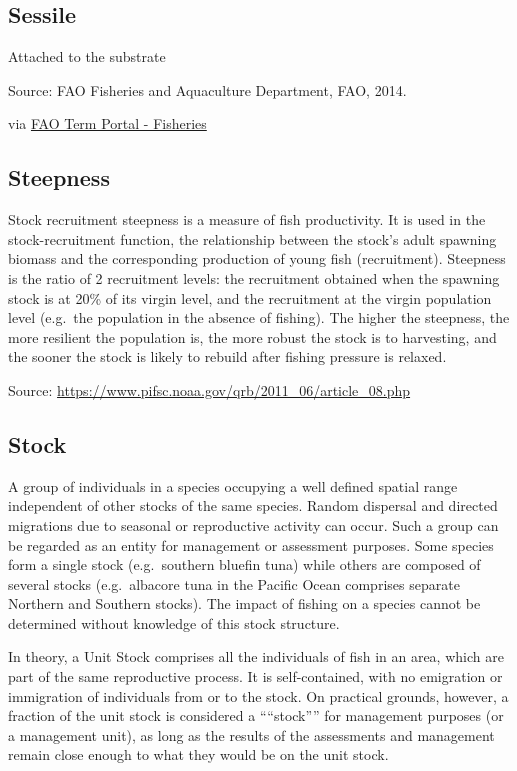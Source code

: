 \documentclass[
  11pt,
]{book}
\begin{document}
\hypertarget{sessile}{%
\subsection{Sessile}\label{sessile}}

Attached to the substrate

Source: FAO Fisheries and Aquaculture Department, FAO, 2014.

via \href{http://www.fao.org/fishery/glossary/en}{FAO Term Portal - Fisheries}

\hypertarget{steepness}{%
\subsection{Steepness}\label{steepness}}

Stock recruitment steepness is a measure of fish productivity. It is used in the stock-recruitment function, the relationship between the stock's adult spawning biomass and the corresponding production of young fish (recruitment). Steepness is the ratio of 2 recruitment levels: the recruitment obtained when the spawning stock is at 20\% of its virgin level, and the recruitment at the virgin population level (e.g.~the population in the absence of fishing). The higher the steepness, the more resilient the population is, the more robust the stock is to harvesting, and the sooner the stock is likely to rebuild after fishing pressure is relaxed.

Source: \url{https://www.pifsc.noaa.gov/qrb/2011_06/article_08.php}

\hypertarget{stock}{%
\subsection{Stock}\label{stock}}

A group of individuals in a species occupying a well defined spatial range independent of other stocks of the same species. Random dispersal and directed migrations due to seasonal or reproductive activity can occur. Such a group can be regarded as an entity for management or assessment purposes. Some species form a single stock (e.g.~southern bluefin tuna) while others are composed of several stocks (e.g.~albacore tuna in the Pacific Ocean comprises separate Northern and Southern stocks). The impact of fishing on a species cannot be determined without knowledge of this stock structure.

In theory, a Unit Stock comprises all the individuals of fish in an area, which are part of the same reproductive process. It is self-contained, with no emigration or immigration of individuals from or to the stock. On practical grounds, however, a fraction of the unit stock is considered a ````stock'''' for management purposes (or a management unit), as long as the results of the assessments and management remain close enough to what they would be on the unit stock.
\end{document}
